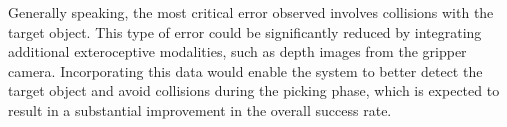 Generally speaking, the most critical error observed involves collisions with the target object. This type of error could be significantly reduced by integrating additional exteroceptive modalities, such as depth images from the gripper camera. Incorporating this data would enable the system to better detect the target object and avoid collisions during the picking phase, which is expected to result in a substantial improvement in the overall success rate.